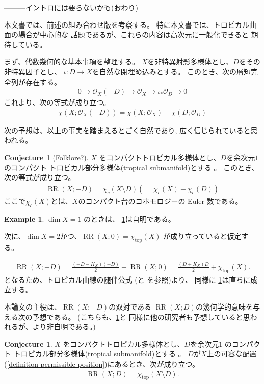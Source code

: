 \documentclass[a4paper,dvipdfmx,reqno,12pt]{amsart}
\theoremstyle{definition}
\newtheorem{example}[theorem]{Example}
\newtheorem{conjecture}[theorem]{Conjecture}
\newcommand{\opn}[1]{\operatorname{#1}}
\numberwithin{equation}{section}
\begin{document}
---------イントロには要らないかも(おわり)

本文書では、前述の組み合わせ版を考察する。
特に本文書では、トロピカル曲面の場合が中心的な
話題であるが、これらの内容は高次元に一般化できると
期待している。

まず、代数幾何的な基本事項を整理する。
$X$を非特異射影多様体とし、$D$をその非特異因子とし、
$\iota\colon D\to X$を自然な閉埋め込みとする。
このとき、次の層短完全列が存在する。
\begin{align}
     0\to \mathcal{O}_X(-D)\to 
\mathcal{O}_X\to \iota_*\mathcal{O}_D\to 0
\end{align}
これより、次の等式が成り立つ。
\begin{align}
\chi(X;\mathcal{O}_X(-D))=\chi(X;\mathcal{O}_X)
-\chi(D;\mathcal{O}_D)
\end{align}

次の予想は、以上の事実を踏まえるとごく自然であり,
広く信じられていると思われる。

\begin{conjecture}[{Folklore?}]
\label{conjecture-rr-c-euler}
$X$ をコンパクトトロピカル多様体とし、$D$を余次元$1$
のコンパクト
トロピカル部分多様体(tropical submanifold)とする
\cite[Definition 2.14]{demedrano2023chern}。
このとき、次の等式が成り立つ。
\begin{align}
\opn{RR}(X;-D)=
\chi_c (X\setminus D) (=\chi_c (X)-\chi_c(D))
\end{align}
ここで$\chi_c(X)$とは、$X$のコンパクト台のコホモロジーの
Euler 数である。

\end{conjecture}

\begin{example}
$\dim X=1$ のときは、
\cref{conjecture-rr-c-euler}は自明である。

次に、$\dim X=2$かつ、$\opn{RR}(X;0)=\chi_{\opn{top}}(X)$
が成り立っていると仮定する。

\begin{align}
\opn{RR}(X;-D)=\frac{(-D-K_X)(-D)}{2}+\opn{RR}(X;0)
=\frac{(D+K_X)D}{2}+\chi_{\opn{top}}(X).
\end{align}
となるため、トロピカル曲線の随伴公式
(\cite[Theorem 6]{shaw2015tropical}と
\cite[Theorem 5.2]{demedrano2023chern}を参照)より、
同様に \cref{conjecture-rr-c-euler}は直ちに成立する。
\end{example}
本論文の主役は、$\opn{RR}(X;-D)$の双対である
$\opn{RR}(X;D)$の幾何学的意味を与える次の予想である。
(こちらも、\cref{conjecture-rr-c-euler}と
同様に他の研究者も予想していると思われるが、より非自明である。)
\begin{conjecture}
\label{conjecture-rr-euler}
$X$ をコンパクトトロピカル多様体とし、$D$を余次元$1$
のコンパクト
トロピカル部分多様体(tropical submanifold)とする
\cite[Definition 2.14]{demedrano2023chern}。
$D$が$X$上の可容な配置
(\cref{definition-permissible-position})にあるとき、次が成り立つ。
\begin{align}
\opn{RR}(X;D)=\chi_{\opn{top}}(X\setminus D).
\end{align}
\end{conjecture}
\end{document}
